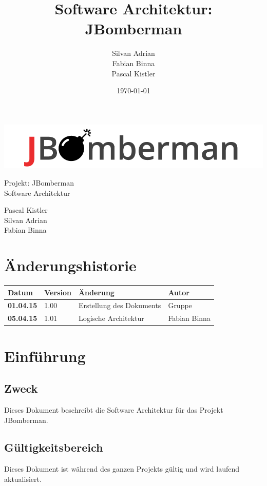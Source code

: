 \documentclass[11pt]{scrartcl}
\title{Software Architektur: JBomberman}
\author{Silvan Adrian \\ Fabian Binna \\ Pascal Kistler}
\date{\today{}}
\begin{document}
\def\arraystretch{1.5}
\begin{titlepage}
\begin{center}
\vspace{10em}
\includegraphics[scale=2]{jbomberman}
\vspace{10em}
\end{center}
\begin{center}
\huge {Projekt: JBomberman} \\
\huge {Software Architektur}
\end{center}
\begin{center}
\vspace{10em}
\LARGE {Pascal Kistler} \\
\LARGE {Silvan Adrian} \\
\LARGE {Fabian Binna}
\end{center}

\end{titlepage}

\newpage
\section{Änderungshistorie}
\label{sec:Änderungen}

\begin{tabularx}{\linewidth}{l l l l}
\textbf{Datum} & \textbf{Version} & \textbf{Änderung}  & \textbf{Autor} \\
\hline
\textbf{01.04.15} & 1.00 & Erstellung des Dokuments & Gruppe \\
\textbf{05.04.15} & 1.01 & Logische Architektur & Fabian Binna \\
\end{tabularx}

\newpage
\tableofcontents
\newpage

\section{Einführung}
\subsection{Zweck}
Dieses Dokument beschreibt die Software Architektur für das Projekt JBomberman.
\subsection{Gültigkeitsbereich}
Dieses Dokument ist während des ganzen Projekts gültig und wird laufend aktualisiert.
\end{document}
